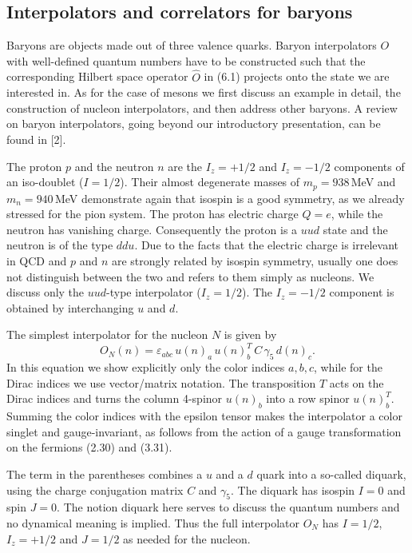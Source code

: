\subsection{Interpolators and correlators for baryons}

Baryons are objects made out of three valence quarks. Baryon interpolators $O$
with well-defined quantum numbers have to be constructed such that the
corresponding Hilbert space operator $\hat{O}$ in (6.1) projects onto the state
we are interested in. As for the case of mesons we first discuss an example in
detail, the construction of nucleon interpolators, and then address other
baryons. A review on baryon interpolators, going beyond our introductory
presentation, can be found in [2].

The proton $p$ and the neutron $n$ are the $I_z = +1/2$ and $I_z = -1/2$
components of an iso-doublet ($I = 1/2$). Their almost degenerate masses of
$m_p = 938$\,MeV and $m_n = 940$\,MeV demonstrate again that isospin is a good
symmetry, as we already stressed for the pion system. The proton has electric
charge $Q = e$, while the neutron has vanishing charge. Consequently the proton
is a $uud$ state and the neutron is of the type $ddu$. Due to the facts that
the electric charge is irrelevant in QCD and $p$ and $n$ are strongly related
by isospin symmetry, usually one does not distinguish between the two and
refers to them simply as nucleons. We discuss only the $uud$-type interpolator
($I_z = 1/2$). The $I_z = -1/2$ component is obtained by interchanging $u$ and
$d$.

The simplest interpolator for the nucleon $N$ is given by
\begin{equation}
  O_N(n) = \varepsilon_{abc}\, u(n)_a\, u(n)_b^T\, C\, \gamma_5\, d(n)_c .
\end{equation}
In this equation we show explicitly only the color indices $a, b, c$, while for
the Dirac indices we use vector/matrix notation. The transposition $T$ acts on
the Dirac indices and turns the column 4-spinor $u(n)_b$ into a row spinor
$u(n)_b^T$. Summing the color indices with the epsilon tensor makes the
interpolator a color singlet and gauge-invariant, as follows from the action of
a gauge transformation on the fermions (2.30) and (3.31).

The term in the parentheses combines a $u$ and a $d$ quark into a so-called
diquark, using the charge conjugation matrix $C$ and $\gamma_5$. The diquark
has isospin $I = 0$ and spin $J = 0$. The notion diquark here serves to discuss
the quantum numbers and no dynamical meaning is implied. Thus the full
interpolator $O_N$ has $I = 1/2$, $I_z = +1/2$ and $J = 1/2$ as needed for the
nucleon.

